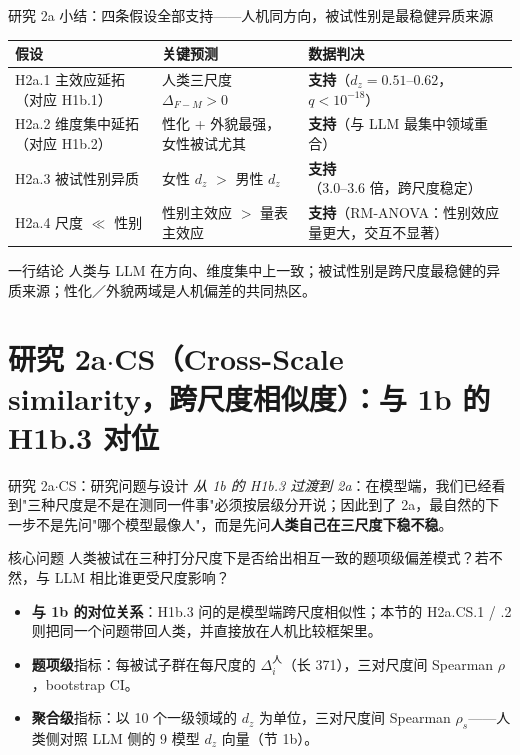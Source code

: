\documentclass[aspectratio=169,professionalfonts]{beamer}
\begin{document}
\begin{frame}{研究 2a 小结：四条假设全部支持——人机同方向，被试性别是最稳健异质来源}
  \footnotesize
  \begin{table}
    \centering
    \begin{tabularx}{\textwidth}{>{\RaggedRight\arraybackslash}p{}>{\RaggedRight\arraybackslash}p{}X}
      \toprule
      假设 & 关键预测 & 数据判决 \\
      \midrule
      H2a.1 主效应延拓（对应 H1b.1） & 人类三尺度 $\Delta_{F-M}>0$ & \textbf{支持}（$d_z = 0.51$--$0.62$，$q<10^{-18}$） \\
      H2a.2 维度集中延拓（对应 H1b.2） & 性化 + 外貌最强，女性被试尤其 & \textbf{支持}（与 LLM 最集中领域重合） \\
      H2a.3 被试性别异质 & 女性 $d_z$ $>$ 男性 $d_z$ & \textbf{支持}（3.0--3.6 倍，跨尺度稳定） \\
      H2a.4 尺度 $\ll$ 性别 & 性别主效应 $>$ 量表主效应 & \textbf{支持}（RM-ANOVA：性别效应量更大，交互不显著） \\
      \bottomrule
    \end{tabularx}
  \end{table}

  \vspace{0.3em}
  \begin{block}{一行结论}
    \small 人类与 LLM 在方向、维度集中上一致；被试性别是跨尺度最稳健的异质来源；性化／外貌两域是人机偏差的共同热区。
  \end{block}
\end{frame}

\section{研究 2a$\cdot$CS（Cross-Scale similarity，跨尺度相似度）：与 1b 的 H1b.3 对位}

\begin{frame}{研究 2a$\cdot$CS：研究问题与设计}
  \small\emph{从 1b 的 H1b.3 过渡到 2a}：在模型端，我们已经看到"三种尺度是不是在测同一件事"必须按层级分开说；因此到了 2a，最自然的下一步不是先问"哪个模型最像人"，而是先问\textbf{人类自己在三尺度下稳不稳}。

  \begin{block}{核心问题}
    \small 人类被试在三种打分尺度下是否给出相互一致的题项级偏差模式？若不然，与 LLM 相比谁更受尺度影响？
  \end{block}

  \begin{itemize}
    \item \textbf{与 1b 的对位关系}：H1b.3 问的是模型端跨尺度相似性；本节的 H2a.CS.1 / .2 则把同一个问题带回人类，并直接放在人机比较框架里。
    \item \textbf{题项级}指标：每被试子群在每尺度的 $\Delta_i^\text{人}$（长 371），三对尺度间 Spearman $\rho$，bootstrap CI。
    \item \textbf{聚合级}指标：以 10 个一级领域的 $d_z$ 为单位，三对尺度间 Spearman $\rho_s$——人类侧对照 LLM 侧的 9 模型 $d_z$ 向量（节 1b）。
  \end{itemize}
\end{frame}
\end{document}
